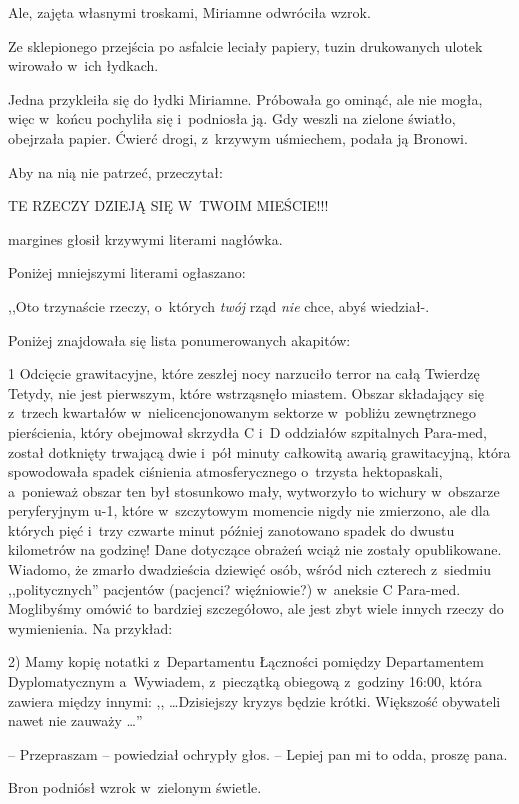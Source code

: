 \documentclass[oneside,polish,11pt,rmheadings]{mwbk}
\begin{document}
Ale, zajęta własnymi troskami, Miriamne odwróciła wzrok. 

Ze sklepionego przejścia po asfalcie leciały papiery, tuzin drukowanych ulotek wirowało w~ich łydkach. 

Jedna przykleiła się do łydki Miriamne. Próbowała go ominąć, ale nie mogła, więc w~końcu pochyliła się i~podniosła ją. Gdy weszli na zielone światło, obejrzała papier. Ćwierć drogi, z~krzywym uśmiechem, podała ją Bronowi. 

Aby na nią nie patrzeć, przeczytał: 

TE RZECZY DZIEJĄ SIĘ W~TWOIM MIEŚCIE!!! 

margines głosił krzywymi literami nagłówka. 

Poniżej mniejszymi literami ogłaszano: 

,,Oto trzynaście rzeczy, o~których \textit{twój }rząd \textit{nie  }chce, abyś wiedział-. 

Poniżej znajdowała się lista ponumerowanych akapitów: 

1 Odcięcie grawitacyjne, które zeszłej nocy narzuciło terror na całą Twierdzę Tetydy, nie jest pierwszym, które wstrząsnęło miastem. Obszar składający się z~trzech kwartałów w~nielicencjonowanym sektorze w~pobliżu zewnętrznego pierścienia, który obejmował skrzydła C i~D oddziałów szpitalnych Para-med, został dotknięty trwającą dwie i~pół minuty całkowitą awarią grawitacyjną, która spowodowała spadek ciśnienia atmosferycznego o~trzysta hektopaskali, a~ponieważ obszar ten był stosunkowo mały, wytworzyło to wichury w~obszarze peryferyjnym u-1, które w~szczytowym momencie nigdy nie zmierzono, ale dla których pięć i~trzy czwarte minut później zanotowano spadek do dwustu kilometrów na godzinę! Dane dotyczące obrażeń wciąż nie zostały opublikowane. Wiadomo, że zmarło dwadzieścia dziewięć osób, wśród nich czterech z~siedmiu ,,politycznych'' pacjentów (pacjenci? więźniowie?) w~aneksie C Para-med.  Moglibyśmy omówić to bardziej szczegółowo, ale jest zbyt wiele innych rzeczy do wymienienia. Na przykład: 

2)  Mamy kopię notatki z~Departamentu Łączności pomiędzy Departamentem Dyplomatycznym a~Wywiadem, z~pieczątką obiegową z~godziny 16:00, która zawiera między innymi: ,, \ldots  Dzisiejszy kryzys będzie krótki. Większość obywateli nawet nie zauważy \ldots '' 

-- Przepraszam -- powiedział ochrypły głos. -- Lepiej pan mi to odda, proszę pana. 

Bron podniósł wzrok w~zielonym świetle. 
\end{document}

